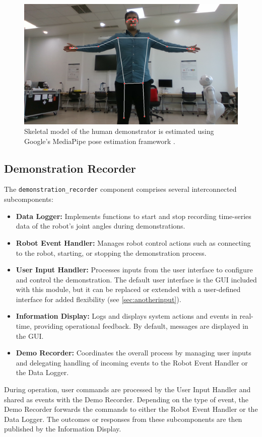 \documentclass{CSSRforAfrica}
\begin{document}
\begin{figure}[ht!]
    \centering
    \includegraphics[width=13cm]{figures/mediapipe.png}
    \captionsetup{width=13cm}
    \caption{Skeletal model of the human demonstrator is estimated using Google's MediaPipe pose estimation framework \cite{lugaresi2019mediapipe}.}
    \label{fig:mediapipe}
\end{figure}


\subsection{Demonstration Recorder}
The \texttt{demonstration\_recorder} component comprises several interconnected subcomponents:
\begin{itemize}
    \item \textbf{Data Logger:} Implements functions to start and stop recording time-series data of the robot’s joint angles during demonstrations.
    \item \textbf{Robot Event Handler:} Manages robot control actions such as connecting to the robot, starting, or stopping the demonstration process.
    \item \textbf{User Input Handler:} Processes inputs from the user interface to configure and control the demonstration. The default user interface is the GUI included with this module, but it can be replaced or extended with a user-defined interface for added flexibility (see \cref{sec:anotherinput}).
    \item \textbf{Information Display:} Logs and displays system actions and events in real-time, providing operational feedback. By default, messages are displayed in the GUI. 
    \item \textbf{Demo Recorder:} Coordinates the overall process by managing user inputs and delegating handling of incoming events to the Robot Event Handler or the Data Logger.

\end{itemize}
During operation, user commands are processed by the User Input Handler and shared as events with the Demo Recorder. Depending on the type of event, the Demo Recorder forwards the commands to either the Robot Event Handler or the Data Logger. The outcomes or responses from these subcomponents are then published by the Information Display.
\end{document}
